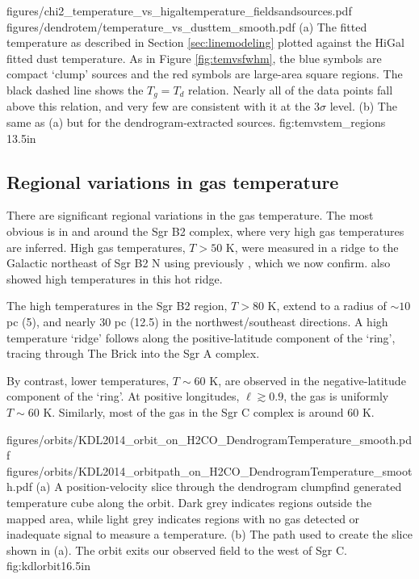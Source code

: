 \FigureTwo
{figures/chi2_temperature_vs_higaltemperature_fieldsandsources.pdf}
{figures/dendrotem/temperature_vs_dusttem_smooth.pdf} %
{(a) The fitted temperature as described in Section \ref{sec:linemodeling} plotted
against the HiGal fitted dust temperature.  As in Figure \ref{fig:temvsfwhm},
the blue symbols are compact `clump' sources and the red symbols are large-area
square regions.  The black dashed line shows the $T_g = T_d$ relation.  Nearly
all of the data points fall above this relation, and very few are consistent
with it at the 3$\sigma$ level.
(b) The same as (a) but for the dendrogram-extracted sources.
}
{fig:temvstem_regions}
{1}{3.5in}

\subsection{Regional variations in gas temperature}
There are significant regional variations in the gas temperature.  The most
obvious is in and around the Sgr B2 complex, where very high gas temperatures
are inferred.  High gas temperatures, $T>50$ K, were measured in a ridge to the
Galactic northeast of Sgr B2 N using \methylcyanide previously \citep[][Figure
4b]{de-Vicente1997a}, which we now confirm.  \citet{Ott2014a} also showed high
\ammonia temperatures in this hot ridge.

The high temperatures in the Sgr B2 region, $T>80$ K, extend to a radius of
$\sim10$ pc (5\arcmin), and nearly 30 pc (12.5\arcmin) in the
northwest/southeast directions.  A high temperature `ridge' follows along the
positive-latitude component of the \citet{Molinari2011a} `ring', tracing
through The Brick into the Sgr A complex.

By contrast, lower temperatures, $T\sim60$ K, are observed in the
negative-latitude component of the `ring'.  At positive longitudes,
$\ell\gtrsim0.9$, the gas is uniformly $T\sim60$ K.  Similarly, most of the gas
in the Sgr C complex is around 60 K.

\FigureTwoAA
{figures/orbits/KDL2014_orbit_on_H2CO_DendrogramTemperature_smooth.pdf}
{figures/orbits/KDL2014_orbitpath_on_H2CO_DendrogramTemperature_smooth.pdf}
{(a) A position-velocity slice through the dendrogram clumpfind generated
temperature cube along the \citet{Kruijssen2015a} orbit.  Dark grey indicates
regions outside the mapped area, while light grey indicates regions with no
gas detected or inadequate signal to measure a temperature.
(b) The path used to create the slice shown in (a).  The orbit exits our
observed field to the west of Sgr C.
}
{fig:kdlorbit}{1}{6.5in}

